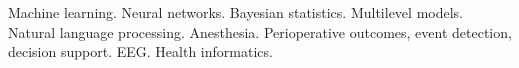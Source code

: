 

\begin{cvparagraph}

Machine learning. Neural networks. Bayesian statistics. Multilevel models. Natural language processing. Anesthesia. Perioperative outcomes, event detection, decision support. EEG. Health informatics.
\end{cvparagraph}